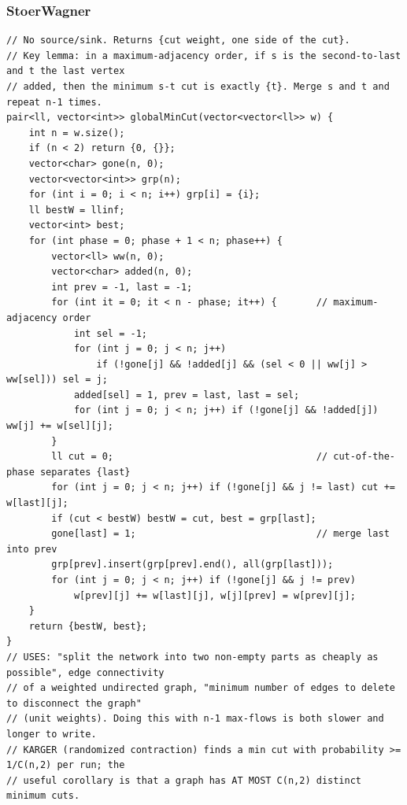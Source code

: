 \documentclass[9pt,a4paper,twocolumn]{extarticle}
\begin{document}
\filbreak
\subsubsection{StoerWagner}
\nopagebreak
\begin{lstlisting}
// No source/sink. Returns {cut weight, one side of the cut}.
// Key lemma: in a maximum-adjacency order, if s is the second-to-last and t the last vertex
// added, then the minimum s-t cut is exactly {t}. Merge s and t and repeat n-1 times.
pair<ll, vector<int>> globalMinCut(vector<vector<ll>> w) {
    int n = w.size();
    if (n < 2) return {0, {}};
    vector<char> gone(n, 0);
    vector<vector<int>> grp(n);
    for (int i = 0; i < n; i++) grp[i] = {i};
    ll bestW = llinf;
    vector<int> best;
    for (int phase = 0; phase + 1 < n; phase++) {
        vector<ll> ww(n, 0);
        vector<char> added(n, 0);
        int prev = -1, last = -1;
        for (int it = 0; it < n - phase; it++) {       // maximum-adjacency order
            int sel = -1;
            for (int j = 0; j < n; j++)
                if (!gone[j] && !added[j] && (sel < 0 || ww[j] > ww[sel])) sel = j;
            added[sel] = 1, prev = last, last = sel;
            for (int j = 0; j < n; j++) if (!gone[j] && !added[j]) ww[j] += w[sel][j];
        }
        ll cut = 0;                                    // cut-of-the-phase separates {last}
        for (int j = 0; j < n; j++) if (!gone[j] && j != last) cut += w[last][j];
        if (cut < bestW) bestW = cut, best = grp[last];
        gone[last] = 1;                                // merge last into prev
        grp[prev].insert(grp[prev].end(), all(grp[last]));
        for (int j = 0; j < n; j++) if (!gone[j] && j != prev)
            w[prev][j] += w[last][j], w[j][prev] = w[prev][j];
    }
    return {bestW, best};
}
// USES: "split the network into two non-empty parts as cheaply as possible", edge connectivity
// of a weighted undirected graph, "minimum number of edges to delete to disconnect the graph"
// (unit weights). Doing this with n-1 max-flows is both slower and longer to write.
// KARGER (randomized contraction) finds a min cut with probability >= 1/C(n,2) per run; the
// useful corollary is that a graph has AT MOST C(n,2) distinct minimum cuts.
\end{lstlisting}
\end{document}

